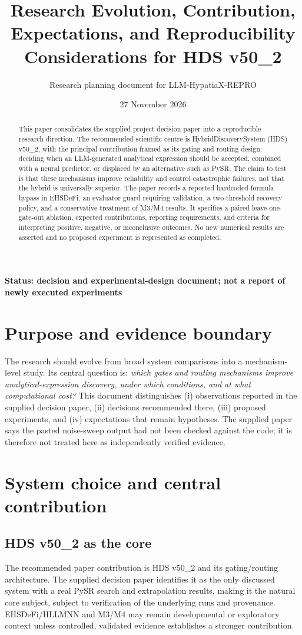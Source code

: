 \documentclass[11pt,a4paper]{article}
\title{Research Evolution, Contribution, Expectations, and Reproducibility Considerations for HDS v50\_2}
\author{Research planning document for LLM-HypatiaX-REPRO}\date{27 November 2026}
\begin{document}
\maketitle
\begin{center}\textbf{Status: decision and experimental-design document; not a report of newly executed experiments}\end{center}
\begin{abstract}
This paper consolidates the supplied project decision paper into a reproducible research direction. The recommended scientific centre is HybridDiscoverySystem (HDS) v50\_2, with the principal contribution framed as its gating and routing design: deciding when an LLM-generated analytical expression should be accepted, combined with a neural predictor, or displaced by an alternative such as PySR. The claim to test is that these mechanisms improve reliability and control catastrophic failures, not that the hybrid is universally superior. The paper records a reported hardcoded-formula bypass in EHSDeFi, an evaluator guard requiring validation, a two-threshold recovery policy, and a conservative treatment of M3/M4 results. It specifies a paired leave-one-gate-out ablation, expected contributions, reporting requirements, and criteria for interpreting positive, negative, or inconclusive outcomes. No new numerical results are asserted and no proposed experiment is represented as completed.
\end{abstract}
\tableofcontents\newpage
\section{Purpose and evidence boundary}
The research should evolve from broad system comparisons into a mechanism-level study. Its central question is: \emph{which gates and routing mechanisms improve analytical-expression discovery, under which conditions, and at what computational cost?} This document distinguishes (i) observations reported in the supplied decision paper, (ii) decisions recommended there, (iii) proposed experiments, and (iv) expectations that remain hypotheses. The supplied paper says the pasted noise-sweep output had not been checked against the code; it is therefore not treated here as independently verified evidence.
\section{System choice and central contribution}
\subsection{HDS v50\_2 as the core}
The recommended paper contribution is HDS v50\_2 and its gating/routing architecture. The supplied decision paper identifies it as the only discussed system with a real PySR search and extrapolation results, making it the natural core subject, subject to verification of the underlying runs and provenance. EHSDeFi/HLLMNN and M3/M4 may remain developmental or exploratory context unless controlled, validated evidence establishes a stronger contribution.
\end{document}
